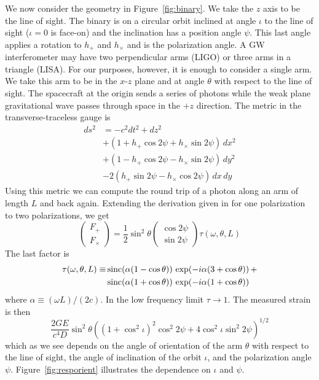 \documentclass[10pt,a4paper]{article}
\def\sinc{\mathop{\rm sinc}\nolimits}
\begin{document}
We now consider the geometry in Figure~\ref{fig:binary}.  We take the
$z$ axis to be the line of sight.  The binary is on a circular orbit
inclined at angle $\iota$ to the line of sight ($\iota=0$ is face-on)
and the inclination has a position angle $\psi$.  This last angle
applies a rotation to $h_+$ and $h_\times$ and is the polarization
angle.  A GW interferometer may have two perpendicular arms (LIGO) or
three arms in a triangle (LISA).  For our purposes, however, it is
enough to consider a single arm.  We take this arm to be in the
$x$-$z$ plane and at angle $\theta$ with respect to the line of sight.
The spacecraft at the origin sends a series of photons while the weak
plane gravitational wave passes through space in the $+z$ direction.
The metric in the transverse-traceless gauge is
\begin{equation}
\begin{aligned}
ds^2 &= -c^2 dt^2 + dz^2 \\
&+ (1 + h_+\cos2\psi + h_\times\sin2\psi) \, dx^2 \\
&+ (1 - h_+\cos2\psi - h_\times\sin2\psi) \, dy^2 \\
&- 2(h_+\sin2\psi - h_\times\cos2\psi) \, dx\,dy
\end{aligned}
\end{equation}
Using this metric we can
compute the round trip of a photon along an arm of length $L$ and 
back again.  Extending the derivation given in \cite{cornish} for
one polarization to two polarizations, we get
\begin{equation}
\begin{pmatrix}
  F_+\\F_\times
\end{pmatrix}
= {\textstyle\frac12} \sin^2\theta 
\begin{pmatrix}
  \cos2\psi\\
  \sin2\psi
\end{pmatrix}
\tau(\omega,\theta,L) 
\end{equation}
The last factor is
\begin{equation}
\begin{aligned}
  \tau(\omega,\theta,L) \equiv
  &\sinc(\alpha(1-\cos\theta))\,\exp(-i\alpha(3+\cos\theta)) \, + \\
  &\sinc(\alpha(1+\cos\theta))\,\exp(-i\alpha(1+\cos\theta))
\end{aligned}  
\end{equation}
where $\alpha\equiv(\omega L)/(2c)$.  In the low frequency limit
$\tau\to1$.  The measured strain is then
\begin{equation}
\frac{2GE}{c^4 D} \sin^2\theta
  \left((1+\cos^2\iota)^2 \cos^2 2\psi + 4\cos^2\iota \sin^2 2\psi\right)^{1/2}
\end{equation}
which as we see depends on the angle of orientation of the arm
$\theta$ with respect to the line of sight, the angle of inclination
of the orbit $\iota$, and the polarization angle $\psi$.
Figure~\ref{fig:resporient} illustrates the dependence on $\iota$ and
$\psi$.
\end{document}
